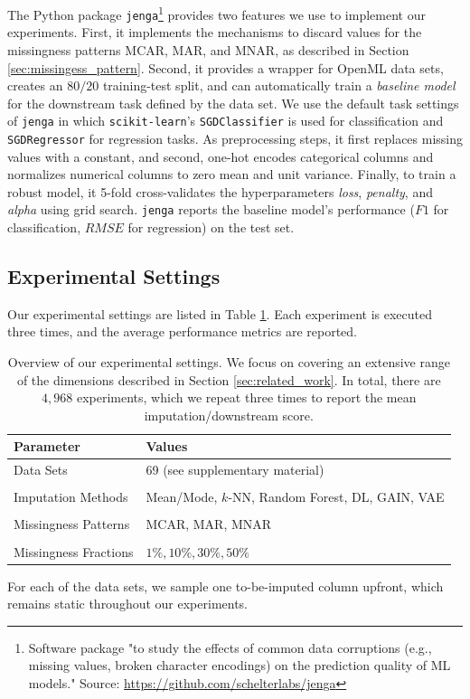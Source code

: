 \documentclass[utf8]{frontiersSCNS} %
\newcommand{\code}[1]{\texttt{#1}}
\begin{document}
The Python package \code{jenga}\footnote{Software package "to study the effects of common data corruptions (e.g., missing values, broken character encodings) on the prediction quality of ML models." Source: \url{https://github.com/schelterlabs/jenga}} \citep{Jenga} provides two features we use to implement our experiments. First, it implements the mechanisms to discard values for the missingness patterns MCAR, MAR, and MNAR, as described in Section \ref{sec:missingess_pattern}. Second, it provides a wrapper for OpenML data sets, creates an $80/20$ training-test split, and can automatically train a \emph{baseline model} for the downstream task defined by the data set. We use the default task settings of \code{jenga} in which \code{scikit-learn}'s \code{SGDClassifier}  is used for classification and \code{SGDRegressor} for regression tasks. As preprocessing steps, it first replaces missing values with a constant, and second, one-hot encodes categorical columns and normalizes numerical columns to zero mean and unit variance. Finally, to train a robust model, it 5-fold cross-validates the hyperparameters \emph{loss}, \emph{penalty}, and \emph{alpha} using grid search. \code{jenga} reports the baseline model's performance ($F1$ for classification, $RMSE$ for regression) on the test set.


\subsection{Experimental Settings}
%
Our experimental settings are listed in Table \ref{tab:experiment_settings}. Each experiment is executed three times, and the average performance metrics are reported.
%
\begin{table}
	\centering
	\begin{tabular}{ll}
		\toprule
		Parameter            & Values                                     \\ \midrule
		Data Sets             & 69 (see supplementary material)    \\
		\\[-0.5em]
		Imputation Methods              & Mean/Mode, $k$-NN, Random Forest, DL, GAIN, VAE \\
		\\[-0.5em]
		Missingness Patterns  & MCAR, MAR, MNAR                            \\
		\\[-0.5em]
		Missingness Fractions & $1\%, 10\%, 30\%, 50\%$                      \\ \bottomrule
	\end{tabular}
	\caption{Overview of our experimental settings. We focus on covering an extensive range of the dimensions described in Section \ref{sec:related_work}. In total, there are $4,968$ experiments, which we repeat three times to report the mean imputation/downstream score.}
	\label{tab:experiment_settings}
\end{table}
%
For each of the data sets, we sample one to-be-imputed column upfront, which remains static throughout our experiments.
\end{document}
